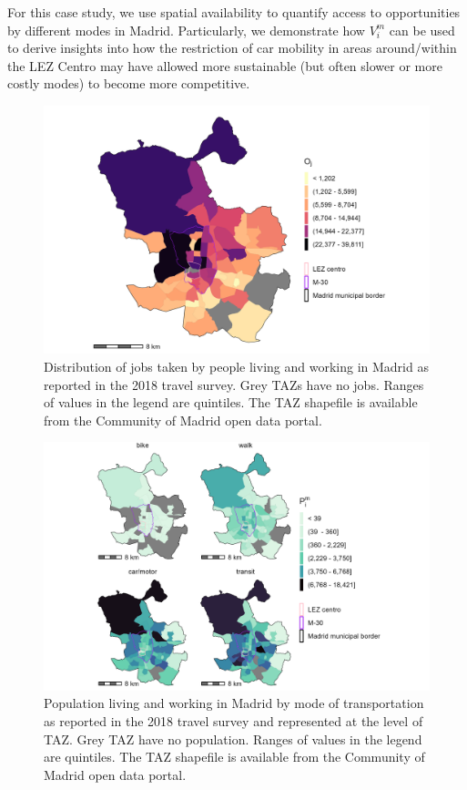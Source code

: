 \documentclass[10pt,letterpaper]{article}
\begin{document}
For this case study, we use spatial availability to quantify access to
opportunities by different modes in Madrid. Particularly, we demonstrate
how \(V_i^m\) can be used to derive insights into how the restriction of
car mobility in areas around/within the LEZ Centro may have allowed more
sustainable (but often slower or more costly modes) to become more
competitive.

\begin{figure}

{\centering \includegraphics[width=0.85\linewidth]{images/Fig2} 

}

\caption{\label{fig:Fig2} Distribution of jobs taken by people living and working in Madrid as reported in the 2018 travel survey. Grey TAZs have no jobs. Ranges of values in the legend are quintiles. The TAZ shapefile is available from the Community of Madrid open data portal.}\label{fig:jobs-plot}
\end{figure}

\begin{figure}

{\centering \includegraphics[width=0.85\linewidth]{images/Fig3} 

}

\caption{\label{fig:Fig3} Population living and working in Madrid by mode of transportation as reported in the 2018 travel survey and represented at the level of TAZ. Grey TAZ have no population. Ranges of values in the legend are quintiles. The TAZ shapefile is available from the Community of Madrid open data portal.}\label{fig:pop-plot}
\end{figure}
\end{document}
